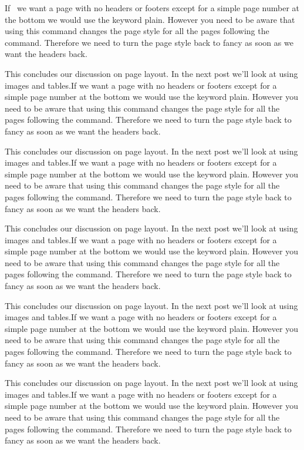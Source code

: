 If~\citet{caselloTransportationActivityCenters2006} we want a page with no headers or footers except for a simple page number at the bottom we would use the keyword plain. However you need to be aware that using this command changes the page style for all the pages following the command. Therefore we need to turn the page style back to fancy as soon as we want the headers back.

This concludes our discussion on page layout. In the next post we'll look at using images and tables.If we want a page with no headers or footers except for a simple page number at the bottom we would use the keyword plain. However you need to be aware that using this command changes the page style for all the pages following the command. Therefore we need to turn the page style back to fancy as soon as we want the headers back.

This concludes our discussion on page layout. In the next post we'll look at using images and tables.If we want a page with no headers or footers except for a simple page number at the bottom we would use the keyword plain. However you need to be aware that using this command changes the page style for all the pages following the command. Therefore we need to turn the page style back to fancy as soon as we want the headers back.

This concludes our discussion on page layout. In the next post we'll look at using images and tables.If we want a page with no headers or footers except for a simple page number at the bottom we would use the keyword plain. However you need to be aware that using this command changes the page style for all the pages following the command. Therefore we need to turn the page style back to fancy as soon as we want the headers back.

This concludes our discussion on page layout. In the next post we'll look at using images and tables.If we want a page with no headers or footers except for a simple page number at the bottom we would use the keyword plain. However you need to be aware that using this command changes the page style for all the pages following the command. Therefore we need to turn the page style back to fancy as soon as we want the headers back.

This concludes our discussion on page layout. In the next post we'll look at using images and tables.If we want a page with no headers or footers except for a simple page number at the bottom we would use the keyword plain. However you need to be aware that using this command changes the page style for all the pages following the command. Therefore we need to turn the page style back to fancy as soon as we want the headers back.


